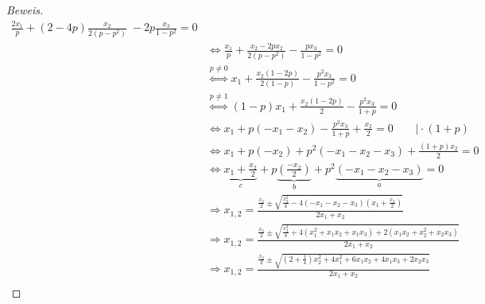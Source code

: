 \documentclass[a4paper]{article}
\begin{document}
\begin{proof}[Beweis]
\begin{align*}
				\frac{ 2 x_1 }{ p } +
				\left(
					2 - 4p
				\right) 
				\frac{ x_2 }{ 2 (p - p ^2) }
				\; - 2p \frac{ x_3 }{ 1 - p ^2 } = 0 \\
				   & \Leftrightarrow \frac{ x_1 }{ p }
				   + \frac{ x_2 - 2p x_2 }{ 2(p - p ^2) }
				   - \frac{ p x_3 }{ 1 - p ^2 } = 0 \\
				   & \overset{p \neq 0} \Longleftrightarrow 
				   x_1 + \frac{ x_2 (1 - 2p) }{ 2 (1- p) }
				   - \frac{ p ^2 x_3 }{ 1 - p ^2 } = 0 \\
				   & \overset{p \neq 1} \Longleftrightarrow 
				   (1 - p) x_1 + \frac{ x_2 (1 - 2p) }{ 2 }
				   - \frac{ p ^2 x_3 }{ 1 + p } = 0 \\
				   & \Leftrightarrow x_1 + p \left(
				   		- x_1 - x_2 
				   \right) - \frac{ p ^2 x_3 }{ 1 + p }
				   + \frac{ x_2 }{ 2 } = 0 \qquad \big \vert \cdot (1+p) \\
				   & \Leftrightarrow x_1 + p \left(
				   		- x_2 
				   \right)
				   + p ^2 \left(
				   		- x_1 - x_2 - x_3
				   \right)
				   + \frac{ (1+p) x_2 }{ 2 } = 0 \\
				   & \Leftrightarrow 
				   \underbrace{ x_1 + \frac{ x_2 }{ 2 } }_{ c } 
				   + p \underbrace{ \left(
					   \frac{ - x_2 }{ 2 } 
				   \right) }_{ b }
					+ p ^2 
				   \underbrace{ 
					   \left(
							- x_1 - x_2 - x_3
					   \right)
				   }_{ a } 
				   = 0 \\
				   & \Rightarrow
				   x_{1,2} = \frac{ 
					   \frac{ x_2 }{ 2 } \pm \sqrt{
						   \frac{ x_2 ^2 }{ 4 } - 4 \left(
						   	- x_1 - x_2 - x_3
						   \right) \left(
						   	x_1 + \frac{ x_2 }{ 2 }
						   \right) 
					   }
					   }{ 
					   2 x_1 + x_2
				   } \\
				   & \Rightarrow
				   x_{1,2} = \frac{ 
					   \frac{ x_2 }{ 2 } \pm \sqrt{
						   \frac{ x_2 ^2 }{ 4 } + 4 \left(
							   x_1 ^2 + x_1 x_2 + x_1 x_3
							   \right) 
							   + 2
							   \left(
								   x_1 x_2 + x_2 ^2 + x_2 x_3
						   \right) 
					   }
					   }{ 
					   2 x_1 + x_2
				   } \\
				   & \Rightarrow
				   x_{1,2} = \frac{ 
					   \frac{ x_2 }{ 2 } \pm \sqrt{
						   (2 + \frac{ 1 }{ 4 }) x_2 ^2
						   + 4 x_1 ^2 + 6 x_1 x_2 
						   + 4 x_1 x_3 + 2 x_2 x_3
					   }
					   }{ 
					   2 x_1 + x_2
				   } \\
		\end{align*}
	\end{proof}
\end{document}
